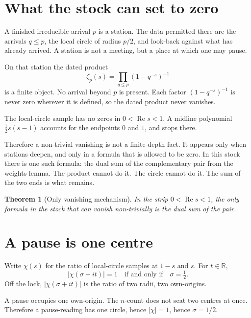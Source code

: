 \documentclass[10pt,a4paper]{article}
\theoremstyle{plain}
\newtheorem{theorem}{Theorem}
\theoremstyle{definition}
\theoremstyle{remark}
\begin{document}
\section{What the stock can set to zero}

A finished irreducible arrival $p$ is a station.
The data permitted there are the arrivals $q\le p$, the local circle of radius $p/2$, and look-back against what has already arrived.
A station is not a meeting, but a place at which one may pause.

On that station the dated product
\[
\zeta_p(s)=\prod_{q\le p}(1-q^{-s})^{-1}
\]
is a finite object.
No arrival beyond $p$ is present.
Each factor $(1-q^{-s})^{-1}$ is never zero wherever it is defined, so the dated product never vanishes.

The local-circle sample has no zeros in $0<\operatorname{Re}s<1$.
A midline polynomial $\tfrac12 s(s-1)$ accounts for the endpoints $0$ and $1$, and stops there.

Therefore a non-trivial vanishing is not a finite-depth fact.
It appears only when stations deepen, and only in a formula that is allowed to be zero.
In this stock there is one such formula: the dual sum of the complementary pair from the weights lemma.
The product cannot do it.
The circle cannot do it.
The sum of the two ends is what remains.

\begin{theorem}[Only vanishing mechanism]
In the strip $0<\operatorname{Re}s<1$, the only formula in the stock that can vanish non-trivially is the dual sum of the pair.
\end{theorem}

\section{A pause is one centre}

Write $\chi(s)$ for the ratio of local-circle samples at $1-s$ and $s$.
For $t\in\mathbb{R}$,
\[
\lvert\chi(\sigma+it)\rvert=1\quad\text{if and only if}\quad\sigma=\tfrac12.
\]
Off the lock, $\lvert\chi(\sigma+it)\rvert$ is the ratio of two radii, two own-origins.

A pause occupies one own-origin.
The $n$-count does not seat two centres at once.
Therefore a pause-reading has one circle, hence $\lvert\chi\rvert=1$, hence $\sigma=1/2$.
\end{document}
